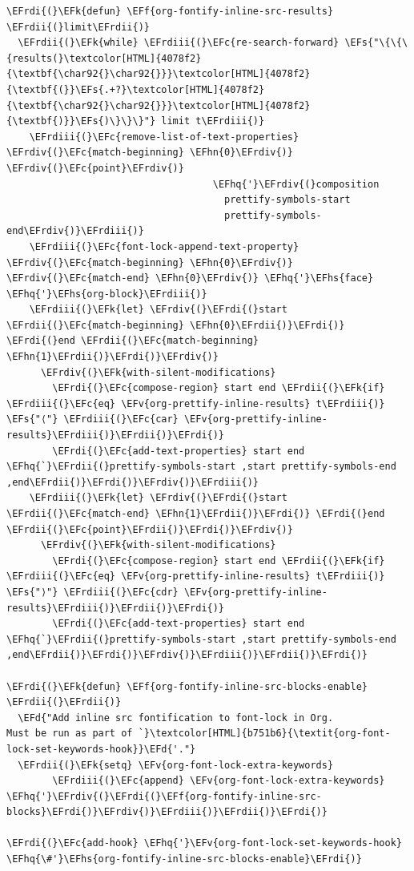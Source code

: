 \documentclass{scrartcl}
\newcommand{\EFk}[1]{\textcolor{EFk}{#1}} %
\newcommand{\EFd}[1]{\textcolor{EFd}{\textit{#1}}} %
\newcommand{\EFs}[1]{\textcolor{EFs}{#1}} %
\newcommand{\EFc}[1]{\textcolor{EFc}{#1}} %
\newcommand{\EFv}[1]{\textcolor{EFv}{#1}} %
\newcommand{\EFf}[1]{\textcolor{EFf}{#1}} %
\newcommand{\EFhn}[1]{\textcolor{EFhn}{\textbf{#1}}} %
\newcommand{\EFhq}[1]{\textcolor{EFhq}{#1}} %
\newcommand{\EFhs}[1]{\textcolor{EFhs}{#1}} %
\newcommand{\EFrdi}[1]{\textcolor{EFrdi}{#1}} %
\newcommand{\EFrdii}[1]{\textcolor{EFrdii}{#1}} %
\newcommand{\EFrdiii}[1]{\textcolor{EFrdiii}{#1}} %
\newcommand{\EFrdiv}[1]{\textcolor{EFrdiv}{#1}} %
\begin{document}
\begin{Code}
\begin{Verbatim}[]
\EFrdi{(}\EFk{defun} \EFf{org-fontify-inline-src-results} \EFrdii{(}limit\EFrdii{)}
  \EFrdii{(}\EFk{while} \EFrdiii{(}\EFc{re-search-forward} \EFs{"\{\{\{results(}\textcolor[HTML]{4078f2}{\textbf{\char92{}\char92{}}}\textcolor[HTML]{4078f2}{\textbf{(}}\EFs{.+?}\textcolor[HTML]{4078f2}{\textbf{\char92{}\char92{}}}\textcolor[HTML]{4078f2}{\textbf{)}}\EFs{)\}\}\}"} limit t\EFrdiii{)}
    \EFrdiii{(}\EFc{remove-list-of-text-properties} \EFrdiv{(}\EFc{match-beginning} \EFhn{0}\EFrdiv{)} \EFrdiv{(}\EFc{point}\EFrdiv{)}
                                    \EFhq{'}\EFrdiv{(}composition
                                      prettify-symbols-start
                                      prettify-symbols-end\EFrdiv{)}\EFrdiii{)}
    \EFrdiii{(}\EFc{font-lock-append-text-property} \EFrdiv{(}\EFc{match-beginning} \EFhn{0}\EFrdiv{)} \EFrdiv{(}\EFc{match-end} \EFhn{0}\EFrdiv{)} \EFhq{'}\EFhs{face} \EFhq{'}\EFhs{org-block}\EFrdiii{)}
    \EFrdiii{(}\EFk{let} \EFrdiv{(}\EFrdi{(}start \EFrdii{(}\EFc{match-beginning} \EFhn{0}\EFrdii{)}\EFrdi{)} \EFrdi{(}end \EFrdii{(}\EFc{match-beginning} \EFhn{1}\EFrdii{)}\EFrdi{)}\EFrdiv{)}
      \EFrdiv{(}\EFk{with-silent-modifications}
        \EFrdi{(}\EFc{compose-region} start end \EFrdii{(}\EFk{if} \EFrdiii{(}\EFc{eq} \EFv{org-prettify-inline-results} t\EFrdiii{)} \EFs{"⟨"} \EFrdiii{(}\EFc{car} \EFv{org-prettify-inline-results}\EFrdiii{)}\EFrdii{)}\EFrdi{)}
        \EFrdi{(}\EFc{add-text-properties} start end \EFhq{`}\EFrdii{(}prettify-symbols-start ,start prettify-symbols-end ,end\EFrdii{)}\EFrdi{)}\EFrdiv{)}\EFrdiii{)}
    \EFrdiii{(}\EFk{let} \EFrdiv{(}\EFrdi{(}start \EFrdii{(}\EFc{match-end} \EFhn{1}\EFrdii{)}\EFrdi{)} \EFrdi{(}end \EFrdii{(}\EFc{point}\EFrdii{)}\EFrdi{)}\EFrdiv{)}
      \EFrdiv{(}\EFk{with-silent-modifications}
        \EFrdi{(}\EFc{compose-region} start end \EFrdii{(}\EFk{if} \EFrdiii{(}\EFc{eq} \EFv{org-prettify-inline-results} t\EFrdiii{)} \EFs{"⟩"} \EFrdiii{(}\EFc{cdr} \EFv{org-prettify-inline-results}\EFrdiii{)}\EFrdii{)}\EFrdi{)}
        \EFrdi{(}\EFc{add-text-properties} start end \EFhq{`}\EFrdii{(}prettify-symbols-start ,start prettify-symbols-end ,end\EFrdii{)}\EFrdi{)}\EFrdiv{)}\EFrdiii{)}\EFrdii{)}\EFrdi{)}

\EFrdi{(}\EFk{defun} \EFf{org-fontify-inline-src-blocks-enable} \EFrdii{(}\EFrdii{)}
  \EFd{"Add inline src fontification to font-lock in Org.
Must be run as part of `}\textcolor[HTML]{b751b6}{\textit{org-font-lock-set-keywords-hook}}\EFd{'."}
  \EFrdii{(}\EFk{setq} \EFv{org-font-lock-extra-keywords}
        \EFrdiii{(}\EFc{append} \EFv{org-font-lock-extra-keywords} \EFhq{'}\EFrdiv{(}\EFrdi{(}\EFf{org-fontify-inline-src-blocks}\EFrdi{)}\EFrdiv{)}\EFrdiii{)}\EFrdii{)}\EFrdi{)}

\EFrdi{(}\EFc{add-hook} \EFhq{'}\EFv{org-font-lock-set-keywords-hook} \EFhq{\#'}\EFhs{org-fontify-inline-src-blocks-enable}\EFrdi{)}
\end{Verbatim}
\end{Code}
\end{document}
